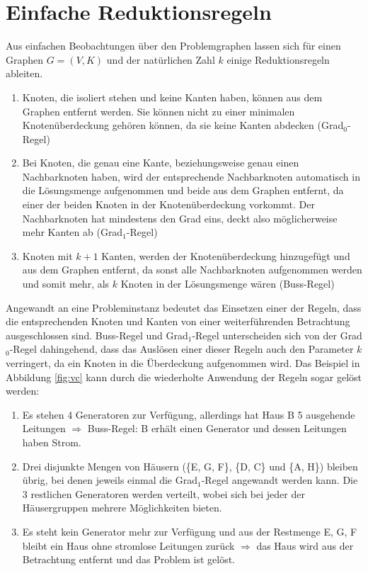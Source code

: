 \label{ch:Grundlagen:sec:Knotenüberdeckung}
\section{Einfache Reduktionsregeln}
\label{ch:Grundlagen:sec:Einfache Reduktionsregeln}
Aus einfachen Beobachtungen über den Problemgraphen lassen sich für einen Graphen $G=(V,K)$ und der natürlichen Zahl $k$ einige Reduktionsregeln ableiten.
\begin{enumerate}
\item Knoten, die isoliert stehen und keine Kanten haben, können aus dem Graphen entfernt werden. Sie können nicht zu einer minimalen Knotenüberdeckung gehören können, da sie keine Kanten abdecken (Grad$_{0}$-Regel)
\item Bei Knoten, die genau eine Kante, beziehungsweise genau einen Nachbarknoten haben, wird der entsprechende Nachbarknoten automatisch in die Lösungsmenge aufgenommen und beide aus dem Graphen entfernt, da einer der beiden Knoten in der Knotenüberdeckung vorkommt. Der Nachbarknoten hat mindestens den Grad eins, deckt also möglicherweise mehr Kanten ab (Grad$_{1}$-Regel)
\item Knoten mit $k+1$ Kanten, werden der Knotenüberdeckung hinzugefügt und aus dem Graphen entfernt, da sonst alle Nachbarknoten aufgenommen werden und somit mehr, als $k$ Knoten in der Lösungsmenge wären (Buss-Regel)
\end{enumerate}
Angewandt an eine Probleminstanz bedeutet das Einsetzen einer der Regeln, dass die entsprechenden Knoten und Kanten von einer weiterführenden Betrachtung ausgeschlossen sind. Buss-Regel und Grad$_{1}$-Regel unterscheiden sich von der Grad$_{0}$-Regel dahingehend, dass das Auslösen einer dieser Regeln auch den Parameter $k$ verringert, da ein Knoten in die Überdeckung aufgenommen wird.
Das Beispiel in Abbildung \ref{fig:vc} kann durch die wiederholte Anwendung der Regeln sogar gelöst werden:
\begin{enumerate}
\item Es stehen 4 Generatoren zur Verfügung, allerdings hat Haus B 5 ausgehende Leitungen $\Rightarrow$ Buss-Regel: B erhält einen Generator und dessen Leitungen haben Strom.
\item Drei disjunkte Mengen von Häusern (\{E, G, F\}, \{D, C\} und \{A, H\}) bleiben übrig, bei denen jeweils einmal die Grad$_{1}$-Regel angewandt werden kann. Die 3 restlichen Generatoren werden verteilt, wobei sich bei jeder der Häusergruppen mehrere Möglichkeiten bieten.
\item Es steht kein Generator mehr zur Verfügung und aus der Restmenge {E, G, F} bleibt ein Haus ohne stromlose Leitungen zurück $\Rightarrow$ das Haus wird aus der Betrachtung entfernt und das Problem ist gelöst.
\end{enumerate}
